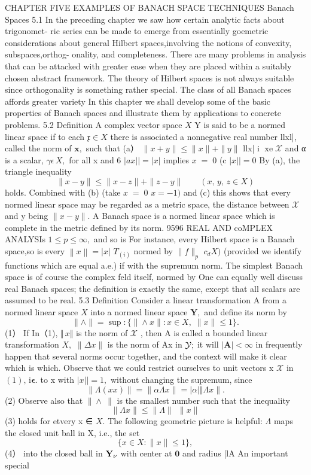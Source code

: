 CHAPTER FIVE EXAMPLES OF BANACH SPACE TECHNIQUES Banach Spaces 5.1 In the preceding chapter we saw how certain analytic facts about trigonomet- ric series can be made to emerge from essentially goemetric considerations about general Hilbert spaces,involving the notions of convexity, subspaces,orthog- onality, and completeness. There are many problems in analysis that can be attacked with greater ease when they are placed within a suitably chosen abstract framework. The theory of Hilbert spaces is not always suitable since orthogonality is something rather special. The class of all Banach spaces affords greater variety In this chapter we shall develop some of the basic properties of Banach spaces and illustrate them by applications to concrete problems. 5.2 Definition A complex vector space $X$ Y is said to be a normed linear space if to each ${\mathfrak{x}}\in X$ there is associated a nonnegative real number llxl|, called the norm of ${\boldsymbol{x}},$ such that (a） $\|x+y\|\leq\|x\|+\|y\|$ llx| i $\operatorname{xe}{\mathcal{X}}$ and α is a scalar, $\gamma\epsilon\,X,$ for all x and 6 $|a x||=|x|$ implies $\scriptstyle x\;=\;0$ (c $|x||=0$ By (a), the triangle inequality $$ \|x-y\|\leq\|x-z\|+\|z-y\|\qquad(x,\,y,\,z\in X) $$ holds. Combined with (b) (take $\scriptstyle x\;=\;0$ $x=-1)$ and (c) this shows that every normed linear space may be regarded as a metric space, the distance between $\scriptstyle{\mathcal{X}}$ and y being $\|x-y\|.$ A Banach space is a normed linear space which is complete in the metric defined by its norm. 9596 REAL AND coMPLEX ANALYSIs $1\leq p\leq\infty,$ and so is For instance, every Hilbert space is a Banach space,so is every $\left\|x\right\|=\left|x\right|$ $\scriptstyle T_{(i)}$ normed by $\|f\|_{p}$ $c_{d}X)$ (provided we identify functions which are equal a.e.) if with the supremum norm. The simplest Banach space is of course the complex feld itself, normed by One can equally well discuss real Banach spaces; the definition is exactly the same, except that all scalars are assumed to be real. 5.3 Definition Consider a linear transformation A from a normed linear space $X$ into a normed linear space ${\boldsymbol{Y}},$ and define its norm by $$ \|\land\|=\operatorname*{sup}:\{\|\land x\|:x\in X,\;\|x\|\leq1\}. $$ (1） If In（1), ${\big\Vert}\,x{\big\Vert}$ is the norm of $\scriptstyle{\mathcal{X}}$ , then A is called a bounded linear transformation $X,$ $\|\Delta x\|$ is the norm of Ax in ${\cal{Y}};$ it will $|\mathbf{A}|<\infty$ in frequently happen that several norms occur together, and the context will make it clear which is which. Observe that we could restrict ourselves to unit vectors x $\scriptstyle{\mathcal{X}}$ in $(1),\,\mathrm{i}{\boldsymbol{\epsilon}}.$ to x with $|x||=1,$ without changing the supremum, since $$ \|\Lambda(x x)\|=\|\alpha\Lambda x\|=|\alpha|\Vert\Lambda x\|. $$ (2) Observe also that $\|\land\ \|$ is the smallest number such that the inequality $$ \|\Lambda x\|\leq\|\Lambda\|\ \ \|x\| $$ (3) holds for etvery x ∈ $X.$ The following geometric picture is helpful: $\Lambda$ maps the closed unit ball in X, i.e., the set $$ \{x\in X\colon\|x\|\leq1\}, $$ (4） into the closed ball in ${\bf Y_{\nu}}$ with center at $\mathbf{0}$ and radius |lA An important special 